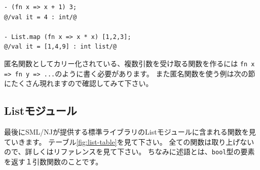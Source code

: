 \documentclass[11pt,a4paper]{article}
\begin{document}
\begin{lstlisting}[caption=匿名関数,label=code:anonymous]
- (fn x => x + 1) 3;
@/val it = 4 : int/@

- List.map (fn x => x * x) [1,2,3];
@/val it = [1,4,9] : int list/@
\end{lstlisting}

匿名関数としてカリー化されている、複数引数を受け取る関数を作るには
\lstinline{fn x => fn y => ...}のように書く必要があります。
また匿名関数を使う例は次の節にたくさん現れますので確認してみて下さい。

\subsection{Listモジュール}

最後にSML/NJが提供する標準ライブラリのListモジュールに含まれる関数を見ていきます。
テーブル\ref{fig:list-table}を見て下さい。
全ての関数は取り上げないので、詳しくはリファレンスを見て下さい\cite{sml-libs}。
ちなみに述語とは、\lstinline{bool}型の要素を返す１引数関数のことです。
\end{document}

